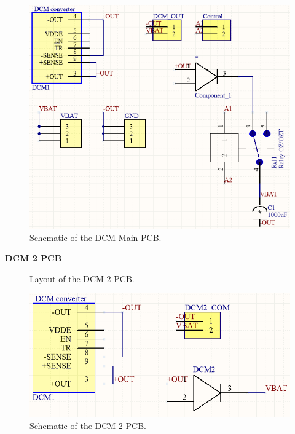 \begin{figure}[!htb]
	\centering
	\includegraphics[width=0.5\linewidth]{Figures/Schematic_DCM_MAIN.PNG}
	\caption{Schematic of the DCM Main PCB.}
	\label{fig:DCM1Schematic}
\end{figure}

\textbf{DCM 2 PCB}
\begin{figure}[!htb]
\centering
  \begin{subfigmatrix}{2}
  \end{subfigmatrix}
  \caption{Layout of the DCM 2 PCB.}
  \label{fig:DCM2Layout}
\end{figure}
\newline

\begin{figure}[!htb]
	\centering
	\includegraphics[width=0.5\linewidth]{Figures/DCM2_Schematic.PNG}
	\caption{Schematic of the DCM 2 PCB.}
	\label{fig:DCM2Schematic}
\end{figure}